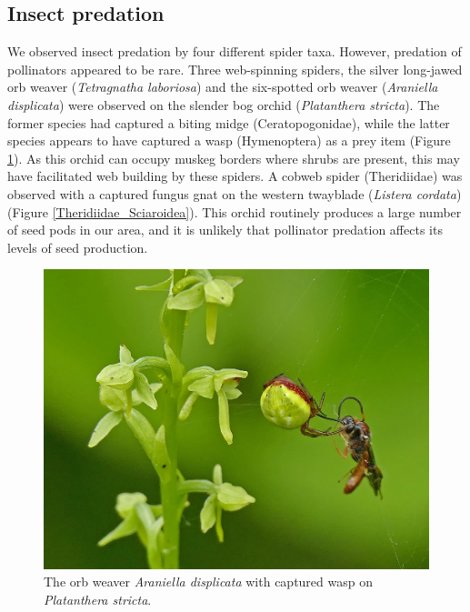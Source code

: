 \begin{multicols}{2}
\subsection{Insect predation}

We observed insect predation by four different spider taxa. However,
predation of pollinators appeared to be rare. Three web-spinning
spiders, the silver long-jawed orb weaver (\emph{Tetragnatha
laboriosa}) and the six-spotted orb weaver (\emph{Araniella
displicata}) were observed on the slender bog orchid (\emph{Platanthera
stricta}). The former species had captured a biting midge
(Ceratopogonidae), while the latter species appears to have captured a wasp (Hymenoptera) %
as a prey item (Figure \ref{Araniella_displicata_Hymenoptera}). As this orchid can occupy muskeg borders where
shrubs are present, this may have facilitated web building by these
spiders. A cobweb spider (Theridiidae) was observed with a captured
fungus gnat on the western twayblade (\emph{Listera cordata}) (Figure
\ref{Theridiidae_Sciaroidea}). This orchid routinely produces a large number of seed pods in our
area, and it is unlikely that pollinator predation affects its levels of
seed production.

\begin{figure}[H]
\begin{center}
\vspace{2mm}
\includegraphics[width=\textwidth]{img/Araniella_displicata_Hymenoptera.jpg}
\caption{The orb weaver \emph{Araniella displicata} with captured wasp on \emph{Platanthera stricta}.}
\label{Araniella_displicata_Hymenoptera}
\end{center}
\end{figure}


\end{multicols}
